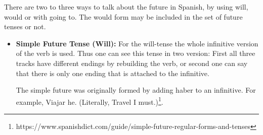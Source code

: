\documentclass[a4paper,12pt]{article}
\begin{document}
There are two to three ways to talk about the future in Spanish, by using \textsf{will},
\textsf{would} or with \textsf{going to}. The \textsf{would} form may be included in the set of
future tenses or not.

\begin{itemize}
\item \textbf{Simple Future Tense (Will):} For the will-tense the whole infinitive version of the
  verb is used. Thus one can see this tense in two version: First all three tracks have different
  endings by rebuilding the verb, or second one can say that there is only one ending that is
  attached to the infinitive.

  The simple future was originally formed by adding \textsf{haber} to an infinitive. For example,
  \textsf{Viajar he}. (Literally, Travel I
  must.)\footnote{https://www.spanishdict.com/guide/simple-future-regular-forms-and-tenses}.



\end{itemize}
\end{document}
